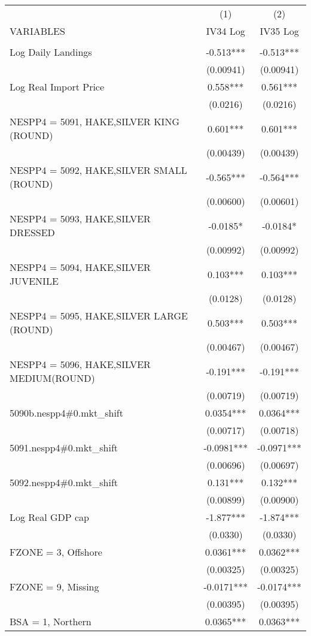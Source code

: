 \begin{tabular}{lcc} \hline
 & (1) & (2) \\
VARIABLES & IV34 Log & IV35 Log \\ \hline
 &  &  \\
Log Daily Landings & -0.513*** & -0.513*** \\
 & (0.00941) & (0.00941) \\
Log Real Import Price & 0.558*** & 0.561*** \\
 & (0.0216) & (0.0216) \\
NESPP4 = 5091, HAKE,SILVER KING (ROUND) & 0.601*** & 0.601*** \\
 & (0.00439) & (0.00439) \\
NESPP4 = 5092, HAKE,SILVER SMALL (ROUND) & -0.565*** & -0.564*** \\
 & (0.00600) & (0.00601) \\
NESPP4 = 5093, HAKE,SILVER DRESSED & -0.0185* & -0.0184* \\
 & (0.00992) & (0.00992) \\
NESPP4 = 5094, HAKE,SILVER JUVENILE & 0.103*** & 0.103*** \\
 & (0.0128) & (0.0128) \\
NESPP4 = 5095, HAKE,SILVER LARGE (ROUND) & 0.503*** & 0.503*** \\
 & (0.00467) & (0.00467) \\
NESPP4 = 5096, HAKE,SILVER MEDIUM(ROUND) & -0.191*** & -0.191*** \\
 & (0.00719) & (0.00719) \\
5090b.nespp4\#0.mkt\_shift & 0.0354*** & 0.0364*** \\
 & (0.00717) & (0.00718) \\
5091.nespp4\#0.mkt\_shift & -0.0981*** & -0.0971*** \\
 & (0.00696) & (0.00697) \\
5092.nespp4\#0.mkt\_shift & 0.131*** & 0.132*** \\
 & (0.00899) & (0.00900) \\
Log Real GDP cap & -1.877*** & -1.874*** \\
 & (0.0330) & (0.0330) \\
FZONE = 3, Offshore & 0.0361*** & 0.0362*** \\
 & (0.00325) & (0.00325) \\
FZONE = 9, Missing & -0.0171*** & -0.0174*** \\
 & (0.00395) & (0.00395) \\
BSA = 1, Northern & 0.0365*** & 0.0363*** \\

\end{tabular}
